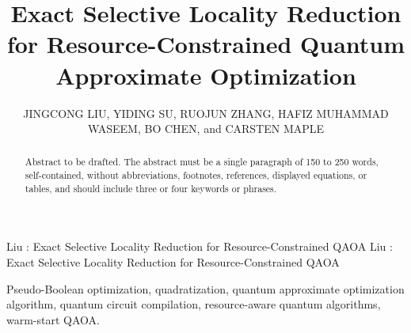 \documentclass{ieeeaccess}
\begin{document}

\title{Exact Selective Locality Reduction for Resource-Constrained Quantum Approximate Optimization}

\author{\uppercase{Jingcong Liu},
\uppercase{Yiding Su},
\uppercase{Ruojun Zhang},
\uppercase{Hafiz Muhammad Waseem},
\uppercase{Bo Chen},
and \uppercase{Carsten Maple}}

\address[1]{Department of Mathematics, University of Warwick, Coventry CV4 7AL,
United Kingdom}
\address[2]{School of Electronics and Computer Science, University of Southampton,
Southampton SO17 1BJ, United Kingdom}
\address[3]{Warwick Manufacturing Group, University of Warwick, Coventry CV4 7AL,
United Kingdom}
\address[4]{Warwick Business School, University of Warwick, Coventry CV4 7AL,
United Kingdom}


\markboth
{Liu \headeretal: Exact Selective Locality Reduction for Resource-Constrained QAOA}
{Liu \headeretal: Exact Selective Locality Reduction for Resource-Constrained QAOA}


\begin{abstract}
Abstract to be drafted. The abstract must be a single paragraph of 150 to 250 words,
self-contained, without abbreviations, footnotes, references, displayed equations, or
tables, and should include three or four keywords or phrases.
\end{abstract}

\begin{keywords}
Pseudo-Boolean optimization, quadratization, quantum approximate optimization algorithm,
quantum circuit compilation, resource-aware quantum algorithms, warm-start QAOA.
\end{keywords}
\end{document}
